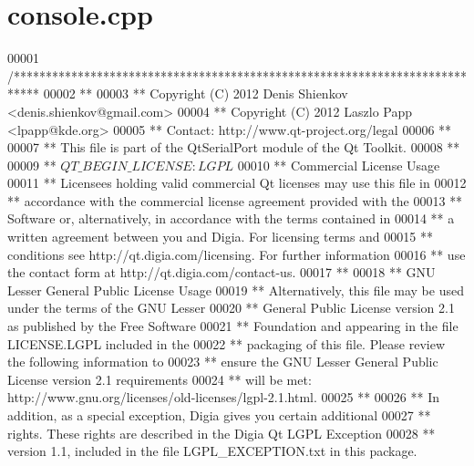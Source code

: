 \hypertarget{a00087_source}{\section{console.\+cpp}
\label{a00087_source}
}

\begin{DoxyCode}
00001 \textcolor{comment}{/****************************************************************************}
00002 \textcolor{comment}{**}
00003 \textcolor{comment}{** Copyright (C) 2012 Denis Shienkov <denis.shienkov@gmail.com>}
00004 \textcolor{comment}{** Copyright (C) 2012 Laszlo Papp <lpapp@kde.org>}
00005 \textcolor{comment}{** Contact: http://www.qt-project.org/legal}
00006 \textcolor{comment}{**}
00007 \textcolor{comment}{** This file is part of the QtSerialPort module of the Qt Toolkit.}
00008 \textcolor{comment}{**}
00009 \textcolor{comment}{** $QT\_BEGIN\_LICENSE:LGPL$}
00010 \textcolor{comment}{** Commercial License Usage}
00011 \textcolor{comment}{** Licensees holding valid commercial Qt licenses may use this file in}
00012 \textcolor{comment}{** accordance with the commercial license agreement provided with the}
00013 \textcolor{comment}{** Software or, alternatively, in accordance with the terms contained in}
00014 \textcolor{comment}{** a written agreement between you and Digia.  For licensing terms and}
00015 \textcolor{comment}{** conditions see http://qt.digia.com/licensing.  For further information}
00016 \textcolor{comment}{** use the contact form at http://qt.digia.com/contact-us.}
00017 \textcolor{comment}{**}
00018 \textcolor{comment}{** GNU Lesser General Public License Usage}
00019 \textcolor{comment}{** Alternatively, this file may be used under the terms of the GNU Lesser}
00020 \textcolor{comment}{** General Public License version 2.1 as published by the Free Software}
00021 \textcolor{comment}{** Foundation and appearing in the file LICENSE.LGPL included in the}
00022 \textcolor{comment}{** packaging of this file.  Please review the following information to}
00023 \textcolor{comment}{** ensure the GNU Lesser General Public License version 2.1 requirements}
00024 \textcolor{comment}{** will be met: http://www.gnu.org/licenses/old-licenses/lgpl-2.1.html.}
00025 \textcolor{comment}{**}
00026 \textcolor{comment}{** In addition, as a special exception, Digia gives you certain additional}
00027 \textcolor{comment}{** rights.  These rights are described in the Digia Qt LGPL Exception}
00028 \textcolor{comment}{** version 1.1, included in the file LGPL\_EXCEPTION.txt in this package.}

\end{DoxyCode}
